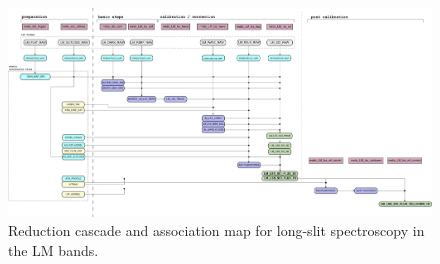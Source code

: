 \begin{figure}
  \centering
  \includegraphics[width=0.9\textheight]{figures/LM_LSS_pipeline_wf_draft_latest_v0.72.png}
  \caption[Reduction cascade and association map for LM long-slit
  spectroscopy]{Reduction cascade and association map for long-slit
    spectroscopy in the LM bands.  }
  \label{Fig:LMLssAssomap}
\end{figure}





